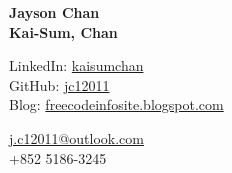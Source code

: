 
\begin{minipage}[b][][c]{15em}
    \Huge\bfseries\color{color-title}
    Jayson Chan\\ %
    \small
    Kai-Sum, Chan %
\end{minipage}%
\hfill
\begin{minipage}[b][][b]{15em}
    \raggedleft
    \small
    LinkedIn: \href{https://www.linkedin.com/in/kaisumchan/}{kaisumchan}\\
    GitHub: \href{https://github.com/jc12011}{jc12011}\\
    Blog: \href{https://freecodeinfosite.blogspot.com/}{freecodeinfosite.blogspot.com}

\end{minipage}%
\hspace{1em}
\begin{minipage}[b][][b]{10em}
    \raggedleft
    \small
    \href{mailto:j.c12011@outlook.com}{j.c12011@outlook.com}\\ %
    +852 5186-3245 %
\end{minipage}
